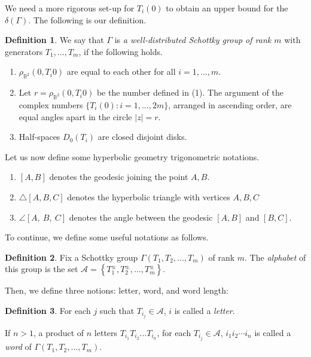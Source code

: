 \documentclass[12pt,oneside]{sfsuthesis}
\theoremstyle{plain} %
\theoremstyle{definition}  %
\newtheorem{definition}{Definition}[chapter]
\theoremstyle{remark}  %
\theoremstyle{plain}
\begin{document}
{We need a more rigorous set-up for $T_i(0)$ to obtain an upper bound for the $\delta(\Gamma)$. The following is our definition.

\begin{definition} We say that $\Gamma$ is \textit{a well-distributed Schottky group of rank $m$}  with generators $T_1,...,T_m$, if the following holds.

\begin{enumerate}
\item[(1)] $\rho_{\mathbb{B}^2}(0,T_i0)$ are equal to each other for all $i=1,...,m$. 
\item[(2)] Let $r = \rho_{\mathbb{B}^2}(0,T_i0)$ be the number defined in (1). The argument of the complex numbers $\{T_i (0): i=1,...,2m\}$, arranged in ascending order, are equal angles apart in the circle  $\vert z\vert=r$. 
\item[(3)] Half-spaces $D_0(T_i)$ are closed disjoint disks. 

\end{enumerate}
\end{definition}





Let us now define some hyperbolic geometry trigonometric notations. 
\begin{enumerate}
\item $[A,B]$ denotes  the geodesic joining the point $A,B$. 
\item $\bigtriangleup [A, B, C]$ denotes the hyperbolic  triangle with vertices $A,B,C$ 
\item $\angle   [A, \ B, \ C]$ denotes the angle between the geodesic $[A,B]$ and $[B,C]$. 
\end{enumerate}

To continue, we define some useful notations as follows.

\begin{definition}
Fix a Schottky group $\Gamma(T_1,T_2,...,T_m)$ of rank $m$. The \textit{alphabet} of this group is the set $\mathcal{A}=\left\lbrace T_1^{\pm},T_2^{\pm},...,T_m^{\pm}\right\rbrace$.
\end{definition}
Then, we define three notions: letter, word, and word length:
\begin{definition}
For each $j$ such that $T_{i_j}\in \mathcal{A}$, $i$ is called a \textit{letter}.

If $n>1$, a product of $n$ letters $T_{i_1}T_{i_2}...T_{i_n}$, for each $T_{i_j}\in \mathcal{A}$, $i_1i_2\cdots i_n$ is called a \textit{word} of $\Gamma(T_1,T_2,...,T_m)$. 


\end{definition}}
\end{document}
